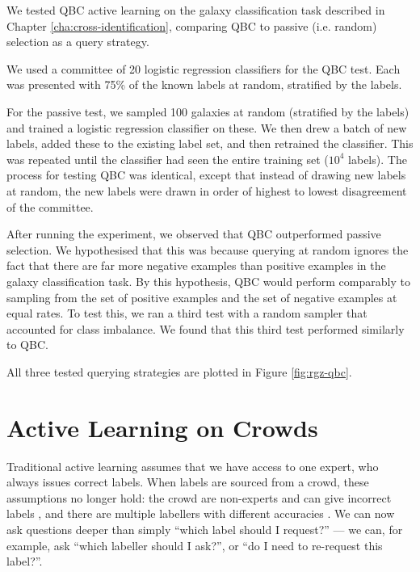     We tested QBC active learning on the galaxy classification task described in
    Chapter \ref{cha:cross-identification}, comparing QBC to passive (i.e.
    random) selection as a query strategy.

    We used a committee of 20 logistic regression classifiers for the QBC test.
    Each was presented with 75\% of the known labels at random, stratified by
    the labels.

    For the passive test, we sampled 100 galaxies at random (stratified by the
    labels) and trained a logistic regression classifier on these. We then drew
    a batch of new labels, added these to the existing label set, and then
    retrained the classifier. This was repeated until the classifier had seen
    the entire training set ($10^4$ labels). The process for testing QBC was
    identical, except that instead of drawing new labels at random, the new
    labels were drawn in order of highest to lowest disagreement of the
    committee.

    After running the experiment, we observed that QBC outperformed passive
    selection. We hypothesised that this was because querying at random ignores
    the fact that there are far more negative examples than positive examples in
    the galaxy classification task. By this hypothesis, QBC would perform
    comparably to sampling from the set of positive examples and the set of
    negative examples at equal rates. To test this, we ran a third test with a
    random sampler that accounted for class imbalance. We found that this third
    test performed similarly to QBC.

    All three tested querying strategies are plotted in Figure
    \ref{fig:rgz-qbc}.

\section{Active Learning on Crowds}
\label{sec:active-learning-on-crowds}
    
    Traditional active learning assumes that we have access to one expert, who
    always issues correct labels. When labels are sourced from a crowd, these
    assumptions no longer hold: the crowd are non-experts and can give incorrect
    labels \citep{mozafari12,yan11}, and there are multiple labellers with
    different accuracies \citep{yan11}. We can now ask questions deeper than
    simply ``which label should I request?'' --- we can, for example, ask
    ``which labeller should I ask?'', or ``do I need to re-request this
    label?''.

